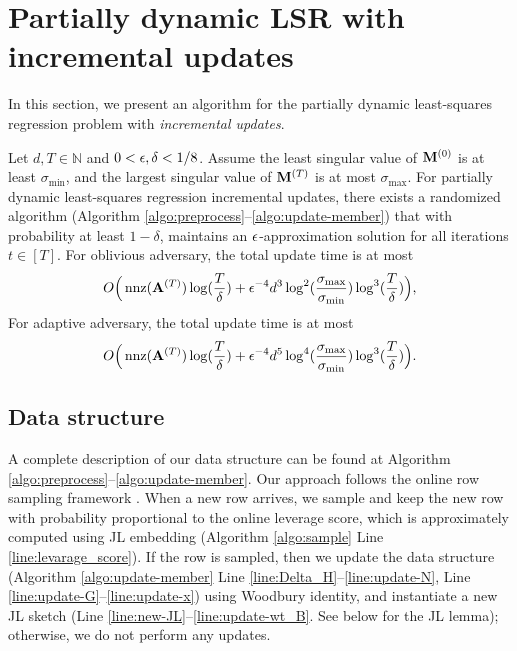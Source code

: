 \section{Partially dynamic LSR with incremental updates}
\label{sec:upper}
In this section, we present an algorithm for the partially dynamic least-squares regression problem with \emph{incremental updates}.



\begin{theorem}\label{thm:upper}
Let $d, T \in \mathbb{N}$ and $0< \epsilon, \delta <1/8$.
Assume the least singular value of $\mathbf{M}^{(0)}$ is at least $\sigma_{\min}$, and the largest singular value of $\mathbf{M}^{(T)}$ is at most $\sigma_{\max}$. 
For partially dynamic least-squares regression incremental updates, there exists a randomized algorithm (Algorithm \ref{algo:preprocess}--\ref{algo:update-member}) that with probability at least $1-\delta$, maintains an $\epsilon$-approximation solution for all iterations $t\in [T]$. 
For oblivious adversary, the total update time is at most 
\[
O\Big(\operatorname{nnz}(\mathbf{A}^{(T)}) \log(\frac{T}{\delta}) + \epsilon^{-4} d^3 \log^2(\frac{\sigma_{\max}}{\sigma_{\min}}) \log^3(\frac{T}{\delta})\Big),
\]  
For adaptive adversary, the total update time is at most 
\[
O\Big(\operatorname{nnz}(\mathbf{A}^{(T)}) \log(\frac{T}{\delta}) + \epsilon^{-4} d^5 \log^4(\frac{\sigma_{\max}}{\sigma_{\min}}) \log^3(\frac{T}{\delta}) \Big).
\]  
\end{theorem}




\subsection{Data structure}\label{sec:data_structure}
A complete description of our data structure can be found at Algorithm \ref{algo:preprocess}--\ref{algo:update-member}.
Our approach follows the online row sampling framework \cite{cmp20}. 
When a new row arrives, we sample and keep the new row with probability proportional to the online leverage score, which is approximately computed using JL embedding (Algorithm \ref{algo:sample} Line \ref{line:levarage_score}).
If the row is sampled, then we update the data structure (Algorithm \ref{algo:update-member} Line \ref{line:Delta_H}--\ref{line:update-N}, Line \ref{line:update-G}--\ref{line:update-x}) using Woodbury identity, and instantiate a new JL sketch (Line \ref{line:new-JL}--\ref{line:update-wt_B}. See below for the JL lemma); otherwise, we do not perform any updates.

